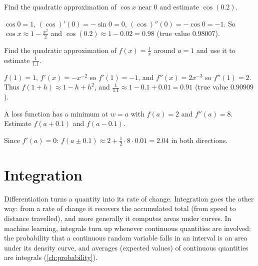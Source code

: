 \begin{exercise}
Find the quadratic approximation of $\cos x$ near $0$ and estimate
$\cos(0.2)$.
\end{exercise}
\begin{solution}
$\cos0 = 1$, $(\cos)'(0) = -\sin0 = 0$, $(\cos)''(0) = -\cos0 = -1$. So
$\cos x \approx 1 - \tfrac{x^2}{2}$ and $\cos(0.2) \approx 1 - 0.02 = 0.98$
(true value $0.98007$).
\end{solution}

\begin{exercise}
Find the quadratic approximation of $f(x) = \frac1x$ around $a = 1$ and use it
to estimate $\frac{1}{1.1}$.
\end{exercise}
\begin{solution}
$f(1) = 1$, $f'(x) = -x^{-2}$ so $f'(1) = -1$, and $f''(x) = 2x^{-3}$ so
$f''(1) = 2$. Thus $f(1 + h) \approx 1 - h + h^2$, and
$\tfrac{1}{1.1} \approx 1 - 0.1 + 0.01 = 0.91$ (true value $0.90909$).
\end{solution}

\begin{exercise}
A loss function has a minimum at $w = a$ with $f(a) = 2$ and $f''(a) = 8$.
Estimate $f(a + 0.1)$ and $f(a - 0.1)$.
\end{exercise}
\begin{solution}
Since $f'(a) = 0$: $f(a \pm 0.1) \approx 2 + \tfrac12\cdot8\cdot0.01 = 2.04$
in both directions.
\end{solution}

\section{Integration}\label{sec:integration}

\begin{motivation}
Differentiation turns a quantity into its rate of change. Integration goes
the other way: from a rate of change it recovers the accumulated total (from
speed to distance travelled), and more generally it computes areas under
curves. In machine learning, integrals turn up whenever continuous quantities
are involved: the probability that a continuous random variable falls in an
interval is an area under its density curve, and averages (expected values) of
continuous quantities are integrals (\cref{ch:probability}).
\end{motivation}

